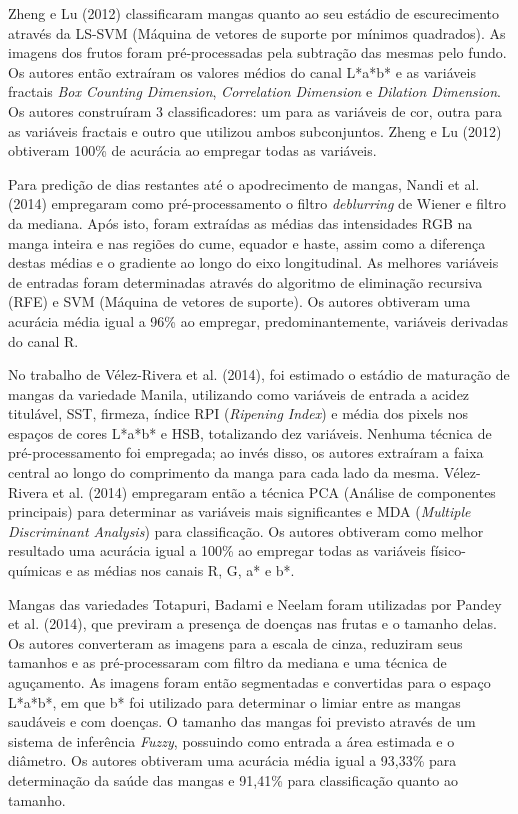 Zheng e Lu (2012) classificaram mangas quanto ao seu estádio de escurecimento através da LS-SVM (Máquina de vetores de suporte por mínimos quadrados). As imagens dos frutos foram pré-processadas pela subtração das mesmas pelo fundo. Os autores então extraíram os valores médios do canal L*a*b* e as variáveis fractais \textit{Box Counting Dimension}, \textit{Correlation Dimension} e \textit{Dilation Dimension}. Os autores construíram 3 classificadores: um para as variáveis de cor, outra para as variáveis fractais e outro que utilizou ambos subconjuntos. Zheng e Lu (2012) obtiveram 100\% de acurácia ao empregar todas as variáveis.

Para predição de dias restantes até o apodrecimento de mangas, Nandi et al. (2014) empregaram como pré-processamento o filtro \textit{deblurring} de Wiener e filtro da mediana. Após isto, foram extraídas as médias das intensidades RGB na manga inteira e nas regiões do cume, equador e haste, assim como a diferença destas médias e o gradiente ao longo do eixo longitudinal. As melhores variáveis de entradas foram determinadas através do algoritmo de eliminação recursiva (RFE) e SVM (Máquina de vetores de suporte). Os autores obtiveram uma acurácia média igual a 96\% ao empregar, predominantemente, variáveis derivadas do canal R.

No trabalho de Vélez-Rivera et al. (2014), foi estimado o estádio de maturação de mangas da variedade Manila, utilizando como variáveis de entrada a acidez titulável, SST, firmeza, índice RPI (\textit{Ripening Index}) e média dos pixels nos espaços de cores L*a*b* e HSB, totalizando dez variáveis. Nenhuma técnica de pré-processamento foi empregada; ao invés disso, os autores extraíram a faixa central ao longo do comprimento da manga para cada lado da mesma. Vélez-Rivera et al. (2014) empregaram então a técnica PCA (Análise de componentes principais) para determinar as variáveis mais significantes e MDA (\textit{Multiple Discriminant Analysis}) para classificação. Os autores obtiveram como melhor resultado uma acurácia igual a 100\% ao empregar todas as variáveis físico-químicas e as médias nos canais R, G, a* e b*.

Mangas das variedades Totapuri, Badami e Neelam foram utilizadas por Pandey et al. (2014), que previram a presença de doenças nas frutas e o tamanho delas. Os autores converteram as imagens para a escala de cinza, reduziram seus tamanhos e as pré-processaram com filtro da mediana e uma técnica de aguçamento. As imagens foram então segmentadas e convertidas para o espaço L*a*b*, em que b* foi utilizado para determinar o limiar entre as mangas saudáveis e com doenças. O tamanho das mangas foi previsto através de um sistema de inferência \textit{Fuzzy}, possuindo como entrada a área estimada e o diâmetro. Os autores obtiveram uma acurácia média igual a 93,33\% para determinação da saúde das mangas e 91,41\% para classificação quanto ao tamanho.

